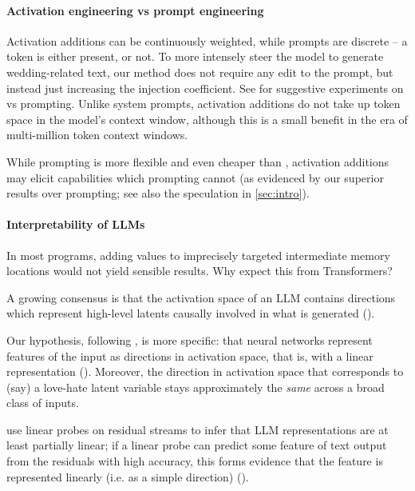 \documentclass{article}
\newcommand{\shortmethod}{\text{ActAdd}}
\theoremstyle{plain}
\theoremstyle{definition}
\theoremstyle{remark}
\begin{document}
\vspace{-1mm}

\paragraph{Activation engineering vs prompt engineering}
Activation additions can be continuously weighted, while prompts are discrete -- a token is either present, or not. To more intensely steer the model to generate wedding-related text, our method does not require any edit to the prompt, but instead just increasing the injection coefficient. See  for suggestive experiments on {\shortmethod} vs prompting. Unlike system prompts, activation additions do not take up token space in the model's context window, although this is a small benefit in the era of multi-million token context windows. 

While prompting is more flexible and even cheaper than {\shortmethod}, activation additions may elicit capabilities which prompting cannot (as evidenced by our superior results over prompting; see also the speculation in \cref{sec:intro}).

\vspace{-1mm}

\paragraph{Interpretability of LLMs}
In most programs, adding values to imprecisely targeted intermediate memory locations would not yield sensible results. Why expect this from Transformers? 

A growing consensus is that the activation space of an LLM contains directions which represent high-level latents causally involved in what is generated (\cite{burns2022discovering,moschella2023relative,li2023emergent,neelnanda_othello, li2023inferencetime}).

Our hypothesis, following \citealt{elhage2022toy}, is more specific: that neural networks represent features of the input as directions in activation space, that is, with a linear representation (\cite{park2023linear}). Moreover, the direction in activation space that corresponds to (say) a love-hate latent variable stays approximately the \textit{same} across a broad class of inputs.

\citealt{alain2018understanding} use linear probes on residual streams to infer that LLM representations are at least partially linear; if a linear probe can predict some feature of text output from the residuals with high accuracy, this forms evidence that the feature is represented linearly (i.e. as a simple direction) (\cite{neelnanda_othello}). 
\end{document}
